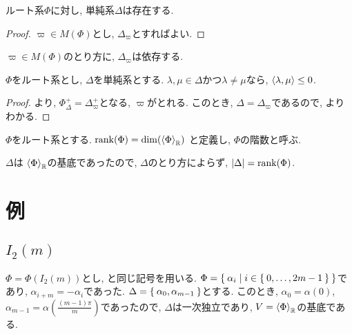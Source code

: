 \begin{cor}
  ルート系$\Phi$に対し, 単純系$\Delta$は存在する.
\end{cor}
\begin{proof}
  $\varpi\in M(\Phi)$とし, $\Delta_\varpi$とすればよい.
\end{proof}
\begin{remark}
  $\varpi\in M(\Phi)$のとり方に, $\Delta_\varpi$は依存する.
\end{remark}

\begin{theorem}
  $\Phi$をルート系とし,
  $\Delta$を単純系とする.
  $\lambda,\mu\in\Delta$かつ$\lambda\neq \mu$なら, $\Braket{\lambda,\mu}\leq 0$.
  
\end{theorem}
\begin{proof}
  より,
  $\Phi_\Delta^+=\Delta_\varpi^+$となる, $\varpi$がとれる.
  このとき, $\Delta=\Delta_\varpi$であるので,
  よりわかる.
\end{proof}



\begin{definition}
  $\Phi$をルート系とする.
  $\operatorname{rank}(\Phi)=\dim(\Braket{\Phi}_{\mathbb{R}})$
  と定義し, $\Phi$の階数と呼ぶ.
\end{definition}

\begin{remark}
  $\Delta$は
  $\Braket{\Phi}_{\mathbb{R}}$の基底であったので,
  $\Delta$のとり方によらず,
  $\left|\Delta\right|=\operatorname{rank}(\Phi)$.
\end{remark}

\section{例}

\subsection{$I_2(m)$}
\label{ex:i2m:simple}
$\Phi=\Phi(I_2(m))$とし,
と同じ記号を用いる.
$\Phi=\Set{\alpha_i|i\in\Set{0,\ldots,2m-1}}$であり, $\alpha_{i+m}=-\alpha_i$であった.
$\Delta=\Set{\alpha_0,\alpha_{m-1}}$とする.
このとき,
$\alpha_{0}=\alpha(0)$, $\alpha_{m-1}=\alpha\left(\frac{(m-1)\pi}{m}\right)$であったので,
$\Delta$は一次独立であり, $V=\Braket{\Phi}_{\mathbb{R}}$の基底である.

